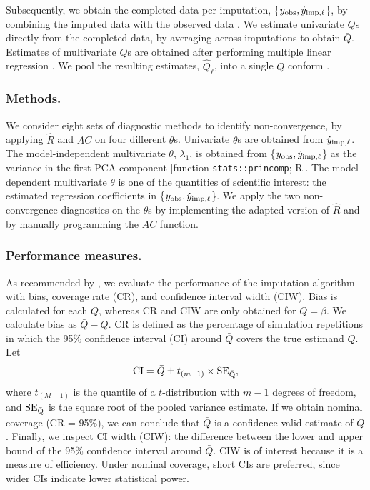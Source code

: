 \documentclass[Royal,times,sageh]{sagej}
\begin{document}
Subsequently, we obtain the completed data per imputation, \{\(y_{\rm obs}, \dot y_{\rm imp, \ell}\)\}, by combining the imputed data with the observed data \citep[function \texttt{mice::complete()};][]{mice}. We estimate univariate \(Q\)s directly from the completed data, by averaging across imputations to obtain \(\bar{Q}\). Estimates of multivariate \(Q\)s are obtained after performing multiple linear regression \citep[function \texttt{stats::lm()},][]{R}. We pool the resulting estimates, \(\hat{Q}_\ell\), into a single \(\bar{Q}\) conform \citet{vink14}.

\hypertarget{methods.}{%
\subsubsection{Methods.}\label{methods.}}

We consider eight sets of diagnostic methods to identify non-convergence, by applying \(\widehat{R}\) and \(AC\) on four different \(\theta\)s. Univariate \(\theta\)s are obtained from \(\dot y_{\rm imp, \ell}\). The model-independent multivariate \(\theta\), \(\lambda_{1}\), is obtained from \{\(y_{\rm obs}, \dot y_{\rm imp, \ell}\)\} as the variance in the first PCA component {[}function \texttt{stats::princomp}; R{]}. The model-dependent multivariate \(\theta\) is one of the quantities of scientific interest: the estimated regression coefficients in \{\(y_{\rm obs}, \dot y_{\rm imp, \ell}\)\}. We apply the two non-convergence diagnostics on the \(\theta\)s by implementing the adapted version of \(\widehat{R}\) and by manually programming the \(AC\) function.

\hypertarget{performance-measures.}{%
\subsubsection{Performance measures.}\label{performance-measures.}}

As recommended by \citet{buur18}, we evaluate the performance of the imputation algorithm with bias, coverage rate (CR), and confidence interval width (CIW). Bias is calculated for each \(Q\), whereas CR and CIW are only obtained for \(Q = \beta\). We calculate bias as \(\bar{Q} - Q\). CR is defined as the percentage of simulation repetitions in which the 95\% confidence interval (CI) around \(\bar{Q}\) covers the true estimand \(Q\). Let
\[\text{CI} = \bar{Q} \pm t_{(m-1)} \times \rm SE_{\bar{Q}},\]
where \(t_{(M-1)}\) is the quantile of a \(t\)-distribution with \(m-1\) degrees of freedom, and \(\rm SE_{\bar{Q}}\) is the square root of the pooled variance estimate. If we obtain nominal coverage (CR = 95\%), we can conclude that \(\bar{Q}\) is a confidence-valid estimate of \(Q\). Finally, we inspect CI width (CIW): the difference between the lower and upper bound of the 95\% confidence interval around \(\bar{Q}\). CIW is of interest because it is a measure of efficiency. Under nominal coverage, short CIs are preferred, since wider CIs indicate lower statistical power.
\end{document}

